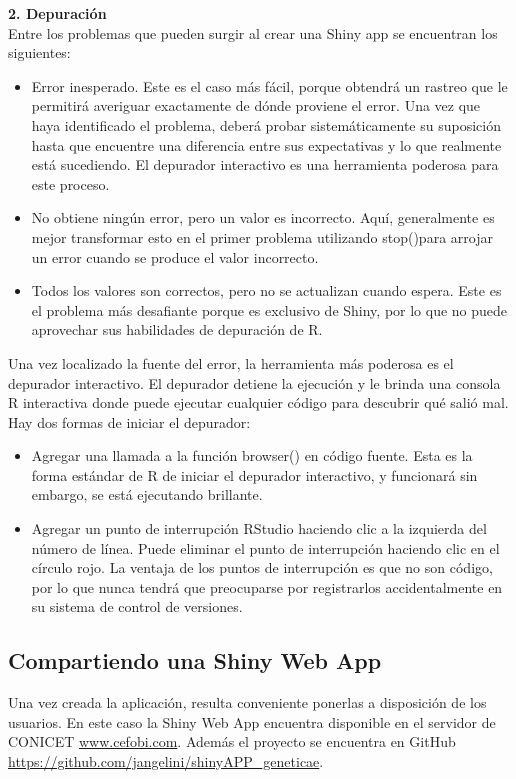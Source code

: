 \textbf{2.\hspace{1cm} Depuración}\\


Entre los problemas que pueden surgir al crear una Shiny app se encuentran los siguientes:

\begin{itemize}
\item Error inesperado. Este es el caso más fácil, porque obtendrá un rastreo que le permitirá averiguar exactamente de dónde proviene el error. Una vez que haya identificado el problema, deberá probar sistemáticamente su suposición hasta que encuentre una diferencia entre sus expectativas y lo que realmente está sucediendo. El depurador interactivo es una herramienta poderosa para este proceso.
\item No obtiene ningún error, pero un valor es incorrecto. Aquí, generalmente es mejor transformar esto en el primer problema utilizando stop()para arrojar un error cuando se produce el valor incorrecto.
\item Todos los valores son correctos, pero no se actualizan cuando espera. Este es el problema más desafiante porque es exclusivo de Shiny, por lo que no puede aprovechar sus habilidades de depuración de R.

\end{itemize}


Una vez localizado la fuente del error, la herramienta más poderosa es el depurador interactivo. El depurador detiene la ejecución y le brinda una consola R interactiva donde puede ejecutar cualquier código para descubrir qué salió mal. Hay dos formas de iniciar el depurador:

\begin{itemize}
\item Agregar una llamada a la función browser() en código fuente. Esta es la forma estándar de R de iniciar el depurador interactivo, y funcionará sin embargo, se está ejecutando brillante.
\item Agregar un punto de interrupción RStudio haciendo clic a la izquierda del número de línea. Puede eliminar el punto de interrupción haciendo clic en el círculo rojo. La ventaja de los puntos de interrupción es que no son código, por lo que nunca tendrá que preocuparse por registrarlos accidentalmente en su sistema de control de versiones.
\end{itemize}





\subsection{Compartiendo una Shiny Web App}

Una vez creada la aplicación, resulta conveniente ponerlas a disposición de los usuarios. En este caso la Shiny Web App encuentra disponible en el servidor de CONICET \url{www.cefobi.com}. Además el proyecto se encuentra en GitHub \url{https://github.com/jangelini/shinyAPP_geneticae}. 

